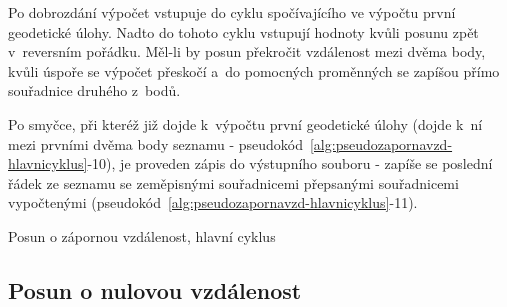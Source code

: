 Po dobrozdání výpočet vstupuje do cyklu spočívajícího ve výpočtu první geode\-tické úlohy.
Nadto do tohoto cyklu vstupují hodnoty kvůli posunu zpět v~reversním pořádku. Měl-li by
posun překročit vzdálenost mezi dvěma body, kvůli úspoře se výpočet přeskočí a~do pomocných
proměnných se zapíšou přímo souřadnice druhého z~bodů. 

Po smyčce, při kteréž již dojde k~výpočtu první geodetické úlohy
(dojde k~ní mezi prvními dvěma body seznamu - pseudokód~\ref{alg:pseudozapornavzd-hlavnicyklus}-10),
je proveden zápis do výstupního souboru - zapíše se poslední řádek ze seznamu se
zeměpisnými souřadnicemi přepsanými souřadnicemi vypočtenými (pseudokód~\ref{alg:pseudozapornavzd-hlavnicyklus}-11). 

\begin{algorithm}
\caption{Posun o zápornou vzdálenost, hlavní cyklus}
    \label{alg:pseudozapornavzd-hlavnicyklus}
    \begin{algorithmic}[1]
\end{algorithmic}
\end{algorithm}

\begin{algorithm}                     
\begin{algorithmic} [1]
    \ENDIF
    \ENDFOR
    \ENDWHILE
    \end{algorithmic}
\end{algorithm}

\subsection{Posun o nulovou vzdálenost}
\label{nulovavzdalenost}

